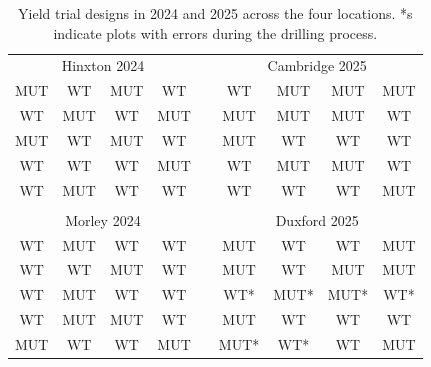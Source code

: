 \documentclass{article}
\begin{document}
\begin{table}[]
	\centering
	\begin{tabular}{@{}cccclcccc@{}}
		\cmidrule(r){1-4} \cmidrule(l){6-9}
		\multicolumn{4}{c}{{Hinxton 2024}} & \textbf{} & \multicolumn{4}{c}{{Cambridge 2025}}                                     \\ \cmidrule(r){1-4} \cmidrule(l){6-9}
		MUT                                & WT        & MUT                                  & WT  &  & WT   & MUT  & MUT  & MUT \\
		WT                                 & MUT       & WT                                   & MUT &  & MUT  & MUT  & MUT  & WT  \\
		MUT                                & WT        & MUT                                  & WT  &  & MUT  & WT   & WT   & WT  \\
		WT                                 & WT        & WT                                   & MUT &  & WT   & MUT  & MUT  & WT  \\
		WT                                 & MUT       & WT                                   & WT  &  & WT   & WT   & WT   & MUT \\ \cmidrule(r){1-4} \cmidrule(l){6-9}
		                                   &           &                                      &     &  &      &      &      &     \\ \cmidrule(r){1-4} \cmidrule(l){6-9}
		\multicolumn{4}{c}{{Morley 2024}}  &           & \multicolumn{4}{c}{{Duxford 2025}}                                       \\ \cmidrule(r){1-4} \cmidrule(l){6-9}
		WT                                 & MUT       & WT                                   & WT  &  & MUT  & WT   & WT   & MUT \\
		WT                                 & WT        & MUT                                  & WT  &  & MUT  & WT   & MUT  & MUT \\
		WT                                 & MUT       & WT                                   & WT  &  & WT*  & MUT* & MUT* & WT* \\
		WT                                 & MUT       & MUT                                  & WT  &  & MUT  & WT   & WT   & WT  \\
		MUT                                & WT        & WT                                   & MUT &  & MUT* & WT*  & WT   & MUT \\ \cmidrule(r){1-4} \cmidrule(l){6-9}
	\end{tabular}
	\caption{Yield trial designs in 2024 and 2025 across the four locations. *s indicate plots with errors during the drilling process.}
	\label{yield_trial_layout}
\end{table}
\end{document}
